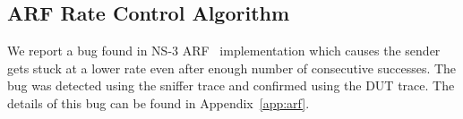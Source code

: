 \subsection{ARF Rate Control Algorithm}
\label{subsec:arf}

We report a bug found in NS-3 ARF~\cite{kamerman1997wavelan} implementation
which causes the sender gets stuck at a lower rate even after enough number of
consecutive successes. The bug was detected using the sniffer trace and
confirmed using the DUT trace. The details of this bug can be found in
Appendix~\ref{app:arf}.
